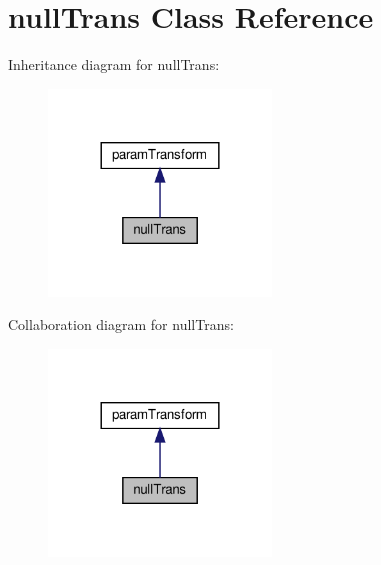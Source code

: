 \hypertarget{classnullTrans}{}\section{null\+Trans Class Reference}
\label{classnullTrans}


Inheritance diagram for null\+Trans\+:
\nopagebreak
\begin{figure}[H]
\begin{center}
\leavevmode
\includegraphics[width=168pt]{classnullTrans__inherit__graph}
\end{center}
\end{figure}


Collaboration diagram for null\+Trans\+:
\nopagebreak
\begin{figure}[H]
\begin{center}
\leavevmode
\includegraphics[width=168pt]{classnullTrans__coll__graph}
\end{center}
\end{figure}

